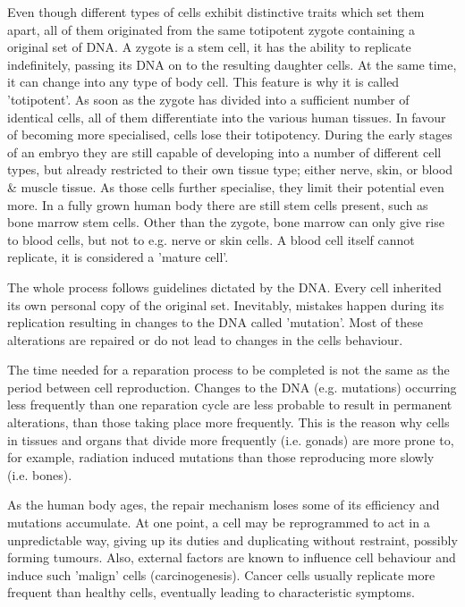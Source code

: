 Even though different types of cells exhibit distinctive traits which set them apart, all of them originated from the same totipotent zygote containing a original set of DNA.
A zygote is a stem cell, it has the ability to replicate indefinitely, passing its DNA on to the resulting daughter cells.
At the same time, it can change into any type of body cell. This feature is why it is called 'totipotent'.
As soon as the zygote has divided into a sufficient number of identical cells, all of them differentiate into the various human tissues.
In favour of becoming more specialised, cells lose their totipotency.
During the early stages of an embryo they are still capable of developing into a number of different cell types, but already restricted to their own tissue type; either nerve, skin, or blood \& muscle tissue.
As those cells further specialise, they limit their potential even more.
In a fully grown human body there are still stem cells present, such as bone marrow stem cells.
Other than the zygote, bone marrow can only give rise to blood cells, but not to e.g. nerve or skin cells.
A blood cell itself cannot replicate, it is considered a 'mature cell'.

The whole process follows guidelines dictated by the DNA.
Every cell inherited its own personal copy of the original set.
Inevitably, mistakes happen during its replication resulting in changes to the DNA called 'mutation'.
Most of these alterations are repaired or do not lead to changes in the cells behaviour.

The time needed for a reparation process to be completed is not the same as the period between cell reproduction. Changes to the DNA (e.g. mutations) occurring less frequently than one reparation cycle are less probable to result in permanent alterations, than those taking place more frequently. This is the reason why cells in tissues and organs that divide more frequently (i.e. gonads) are more prone to, for example, radiation induced mutations than those reproducing more slowly (i.e. bones).

As the human body ages, the repair mechanism loses some of its efficiency and mutations accumulate.
At one point, a cell may be reprogrammed to act in a unpredictable way, giving up its duties and duplicating without restraint, possibly forming tumours.
Also, external factors are known to influence cell behaviour and induce such 'malign' cells (carcinogenesis).
Cancer cells usually replicate more frequent than healthy cells, eventually leading to characteristic symptoms.

